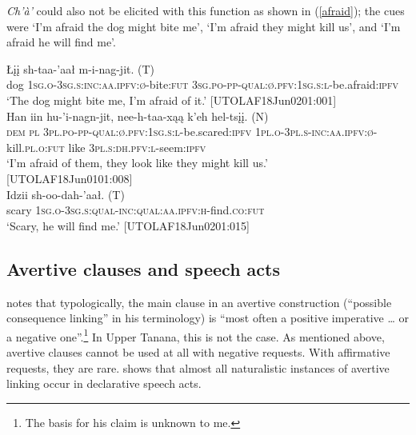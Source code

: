 \documentclass[output=paper,colorlinks,citecolor=brown
]{langscibook}
\begin{document}
\textit{Ch'à'} could also not be elicited with this function as shown in (\ref{afraid}); the cues were `I'm afraid the dog might bite me', `I'm afraid they might kill us', and `I'm afraid he will find me'. 

\begin{exe}
\ex\label{afraid}
\begin{xlista}
\ex
\gll Łįį sh-taa-'aał {m-i-nag-jit. \textnormal{(T)}} \\
dog \textsc{1sg.o-3sg.s:inc:aa.ipfv:ø}-bite:\textsc{fut} \textsc{3sg.po-pp-qual:ø.pfv:1sg.s:l}-be.afraid:\textsc{ipfv} \\
\glt `The dog might bite me, I'm afraid of it.' \hfill [UTOLAF18Jun0201:001]\\
\ex 
\gll Han iin hu-'i-nagn-jit, nee-h-taa-xąą k'eh {hel-tsįį. \textnormal{(N)}}\\
\textsc{dem} \textsc{pl} \textsc{3pl.po-pp-qual:ø.pfv:1sg.s:l}-be.scared:\textsc{ipfv} \textsc{1pl.o-3pl.s-inc:aa.ipfv:ø}-kill.\textsc{pl.o:fut} like \textsc{3pl.s:dh.pfv:l}-seem:\textsc{ipfv}\\
\glt `I'm afraid of them, they look like they might kill us.' \\ \hfill [UTOLAF18Jun0101:008]\\
\ex
\gll Idzii {sh-oo-dah-'aał. \textnormal{(T)}} \\
scary \textsc{1sg.o-3sg.s:qual-inc:qual:aa.ipfv:h}-find.\textsc{co:fut} \\
\glt `Scary, he will find me.' \hfill [UTOLAF18Jun0201:015]\\
\end{xlista}
\end{exe}


\subsection{Avertive clauses and speech acts}
\label{subsubsection:avertive-speech}

\citet[24]{DixonRMW2009} notes that typologically, the main clause in an avertive construction (``possible consequence linking'' in his terminology) is ``most often a positive imperative  {\ldots} or a negative one''.\footnote{The basis for his claim is unknown to me.} In Upper Tanana, this is not the case. As mentioned above, avertive clauses cannot be used at all with negative requests. With affirmative requests, they are rare.  shows that almost all naturalistic instances of avertive linking occur in declarative speech acts.
\end{document}
